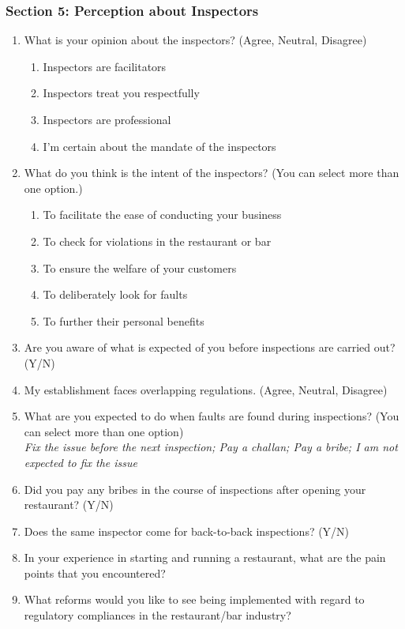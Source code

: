 \documentclass[a4paper, 12pt]{article}
\begin{document}
	\subsubsection* {Section 5: Perception about Inspectors}
		\begin {enumerate}[-,nosep]
		\item What is your opinion about the inspectors? (Agree, Neutral, Disagree)
			\begin {enumerate}[-,nosep]
			\item Inspectors are facilitators
			\item Inspectors treat you respectfully
			\item Inspectors are professional
			\item I’m certain about the mandate of the inspectors
			\end {enumerate}
		\item What do you think is the intent of the inspectors? (You can select more than one option.)
			\begin {enumerate}[-,nosep]
			\item To facilitate the ease of conducting your business
			\item To check for violations in the restaurant or bar
			\item To ensure the welfare of your customers
			\item To deliberately look for faults
			\item To further their personal benefits
			\end {enumerate}
		\item Are you aware of what is expected of you before inspections are carried out?(Y/N)
		\item My establishment faces overlapping regulations. (Agree, Neutral, Disagree)
		\item What are you expected to do when faults are found during inspections? (You can select more than one option)\\
		\textit{Fix the issue before the next inspection; Pay a challan; Pay a bribe; I am not expected to fix the issue}
		\item Did you pay any bribes in the course of inspections after opening your restaurant? (Y/N)
		\item Does the same inspector come for back-to-back inspections? (Y/N)
		\item In your experience in starting and running a restaurant, what are the pain points that you encountered?
		\item What reforms would you like to see being implemented with regard to regulatory compliances in the restaurant/bar industry?
		\end {enumerate}
       

                    
                    
                    
\end{document}
